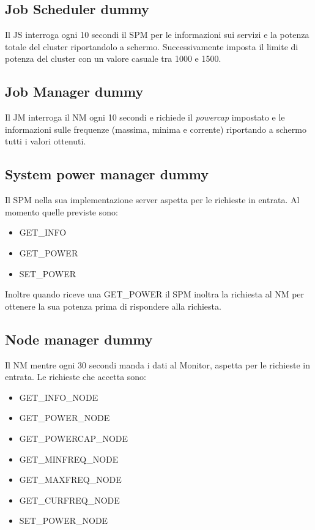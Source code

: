 \subsection*{Job Scheduler dummy}
Il JS interroga ogni 10 secondi  il SPM per le informazioni sui servizi e la potenza totale del cluster riportandolo a schermo. Successivamente  imposta il limite di potenza del cluster con un valore casuale tra 1000 e 1500.

\subsection*{Job Manager dummy}
Il JM interroga il NM ogni 10 secondi e richiede il \emph{powercap} impostato e le informazioni sulle frequenze (massima, minima e corrente) riportando a schermo tutti i valori ottenuti.

\subsection*{System power manager dummy}
Il SPM nella sua implementazione server aspetta per le richieste in entrata. Al momento quelle previste sono:
\begin{itemize}
    \item GET\_INFO
    \item GET\_POWER
    \item SET\_POWER
\end{itemize}
Inoltre quando riceve una GET\_POWER il SPM inoltra la richiesta al NM per ottenere la sua potenza prima di rispondere alla richiesta. 

\subsection*{Node manager dummy}
Il NM mentre ogni 30 secondi manda i dati al Monitor, aspetta per le richieste in entrata. Le richieste che accetta sono:
\begin{itemize}
    \item GET\_INFO\_NODE
    \item GET\_POWER\_NODE
    \item GET\_POWERCAP\_NODE 
    \item GET\_MINFREQ\_NODE   
    \item GET\_MAXFREQ\_NODE     
    \item GET\_CURFREQ\_NODE   
    \item SET\_POWER\_NODE
\end{itemize}

